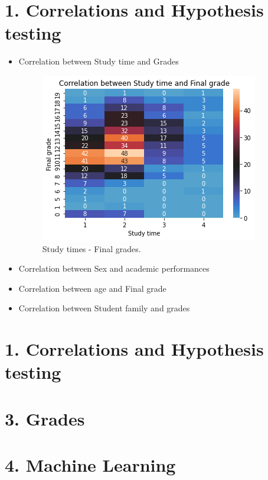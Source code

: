 \documentclass[a4paper, 11pt]{report}
\theoremstyle{definition}
\numberwithin{equation}{section}		%
\numberwithin{figure}{section}			%
\numberwithin{table}{section}				%
\begin{document}
\section*{1. Correlations and Hypothesis testing}


\begin{itemize}
\item Correlation between Study time and Grades

\begin{figure}[h]\centering
\includegraphics[scale=0.5]{g3-st.png}
\caption{Study times - Final grades.}
\end{figure}


\item Correlation between Sex and academic performances


\item Correlation between age and Final grade


\item Correlation between Student family and grades


\end{itemize}




\section*{1. Correlations and Hypothesis testing}

\section*{3. Grades}


\section*{4. Machine Learning}
\end{document}
